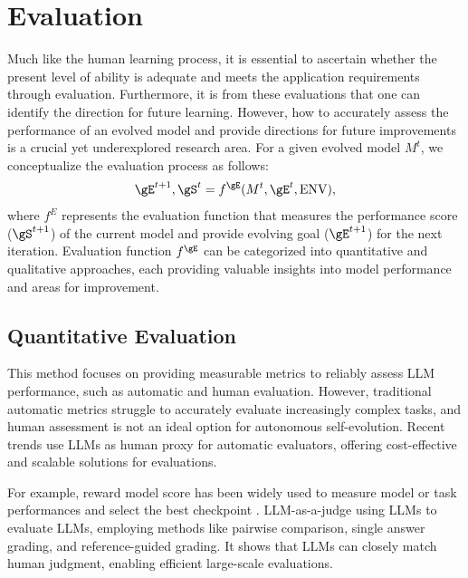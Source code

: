 \documentclass[sn-basic, Numbered]{sn-jnl}%
\theoremstyle{thmstyleone}%
\theoremstyle{thmstyletwo}%
\theoremstyle{thmstylethree}%
\begin{document}


\section{Evaluation}
\label{sec:evaluation}
Much like the human learning process, it is essential to ascertain whether the present level of ability is adequate and meets the application requirements through evaluation. Furthermore, it is from these evaluations that one can identify the direction for future learning.
However, how to accurately assess the performance of an evolved model and provide directions for future improvements is a crucial yet underexplored research area. For a given evolved model $M^t$, we conceptualize the evaluation process as follows:
\begin{equation}
  \gE^{t+1}, \gS^{t} = f^{\gE}(M^t, \gE^{t}, \mathrm{ENV}),
\end{equation}
where $f^E$ represents the evaluation function that measures the performance score ($\gS^{t+1}$) of the current model and provide evolving goal ($\gE^{t+1}$) for the next iteration. Evaluation function $f^\gE$ can be categorized into quantitative and qualitative approaches, each providing valuable insights into model performance and areas for improvement.

\subsection{Quantitative Evaluation}
This method focuses on providing measurable metrics to reliably assess LLM performance, such as automatic \cite{papineni2002bleu, lin2004rouge} and human evaluation. However, traditional automatic metrics struggle to accurately evaluate increasingly complex tasks, and human assessment is not an ideal option for autonomous self-evolution. Recent trends use LLMs as human proxy for automatic evaluators, offering cost-effective and scalable solutions for evaluations. 

For example, reward model score has been widely used to measure model or task performances \cite{shinn2023reflexion} and select the best checkpoint \cite{ouyang2022training}. LLM-as-a-judge \cite{zheng2024judging} using LLMs to evaluate LLMs, employing methods like pairwise comparison, single answer grading, and reference-guided grading. It shows that LLMs can closely match human judgment, enabling efficient large-scale evaluations.
\end{document}
